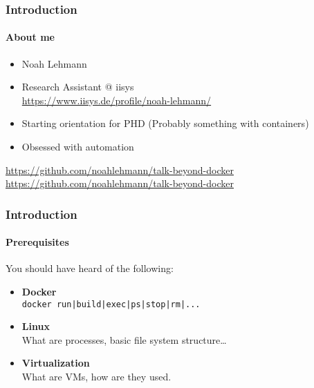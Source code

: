 \begin{frame}[c]
    \frametitle{Introduction}
    \framesubtitle{About me}
    \begin{itemize}
        \item Noah Lehmann
        \item Research Assistant @ iisys\\ \url{https://www.iisys.de/profile/noah-lehmann/}
        \item Starting orientation for PHD (Probably something with containers)
        \item Obsessed with automation
    \end{itemize}
    \vspace{1cm}
    \url{https://github.com/noahlehmann/talk-beyond-docker}
    \url{https://github.com/noahlehmann/talk-beyond-docker}
\end{frame}

\begin{frame}[c]
    \frametitle{Introduction}
    \framesubtitle{Prerequisites}
    You should have heard of the following:
    \vspace{0.5cm}
    \begin{itemize}
        \item \textbf{Docker}\\
        \texttt{docker run|build|exec|ps|stop|rm|...}
        \item \textbf{Linux}\\
        What are processes, basic file system structure\ldots
        \item \textbf{Virtualization}\\
        What are VMs, how are they used.
    \end{itemize}
\end{frame}